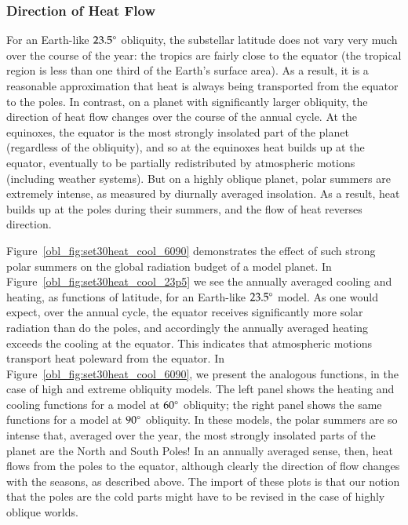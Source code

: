 \subsubsection{Direction of Heat Flow}
\label{obl_sssec:direction}

For an Earth-like $23.5\mbox{$^\circ$}$ obliquity, the substellar latitude does
not vary very much over the course of the year: the tropics are fairly
close to the equator (the tropical region is less than one third of
the Earth's surface area).  As a result, it is a reasonable
approximation that heat is always being transported from the equator
to the poles.  In contrast, on a planet with significantly larger
obliquity, the direction of heat flow changes over the course of the
annual cycle.  At the equinoxes, the equator is the most strongly
insolated part of the planet (regardless of the obliquity), and so at
the equinoxes heat builds up at the equator, eventually to be
partially redistributed by atmospheric motions (including weather
systems).  But on a highly oblique planet, polar summers are extremely
intense, as measured by diurnally averaged insolation.  As a result,
heat builds up at the poles during their summers, and the flow of heat
reverses direction.

Figure~\ref{obl_fig:set30heat_cool_6090} demonstrates the effect of
such strong polar summers on the global radiation budget of a model
planet.  In Figure~\ref{obl_fig:set30heat_cool_23p5} we see the
annually averaged cooling and heating, as functions of latitude, for
an Earth-like $23.5\mbox{$^\circ$}$ model.  As one would expect, over the annual
cycle, the equator receives significantly more solar radiation than do
the poles, and accordingly the annually averaged heating exceeds the
cooling at the equator.  This indicates that atmospheric motions
transport heat poleward from the equator.  In
Figure~\ref{obl_fig:set30heat_cool_6090}, we present the analogous
functions, in the case of high and extreme obliquity models. The left
panel shows the heating and cooling functions for a model at $60\mbox{$^\circ$}$
obliquity; the right panel shows the same functions for a model at
$90\mbox{$^\circ$}$ obliquity. In these models, the polar summers are so intense
that, averaged over the year, the most strongly insolated parts of the
planet are the North and South Poles!  In an annually averaged sense,
then, heat flows from the poles to the equator, although clearly the
direction of flow changes with the seasons, as described above.  The
import of these plots is that our notion that the poles are the cold
parts might have to be revised in the case of highly oblique worlds.

